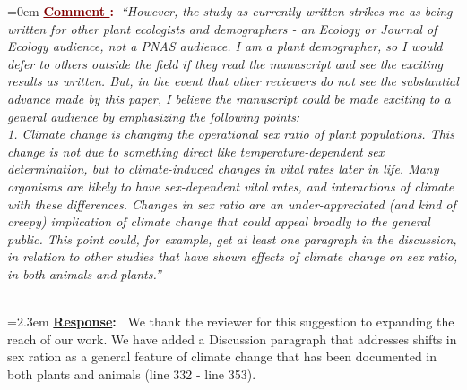 \documentclass[12pt]{article}
\newcounter{cN}
\newcommand{\comment}[1]{
	\vspace{2em}
	\refstepcounter{cN} %
	\noindent \hangindent=0em \textbf{\textcolor{Maroon}{\uline{Comment \thecN}:~}}\emph{``#1''}
	}
\newcommand{\response}[1]{
	\\[0.25em]
	\hangindent=2.3em \textbf{\textcolor{NavyBlue}{\uline{Response}:~}}#1
	}
\begin{document}
\comment{However, the study as currently written strikes me as being written for other plant ecologists and demographers - an Ecology or Journal of Ecology audience, not a PNAS audience. I am a plant demographer, so I would defer to others outside the field if they read the manuscript and see the exciting results as written. But, in the event that other reviewers do not see the substantial advance made by this paper, I believe the manuscript could be made exciting to a general audience by emphasizing the following points:
\\
1. Climate change is changing the operational sex ratio of plant populations. This change is not due to something direct like temperature-dependent sex determination, but to climate-induced changes in vital rates later in life. Many organisms are likely to have sex-dependent vital rates, and interactions of climate with these differences. Changes in sex ratio are an under-appreciated (and kind of creepy) implication of climate change that could appeal broadly to the general public. This point could, for example, get at least one paragraph in the discussion, in relation to other studies that have shown effects of climate change on sex ratio, in both animals and plants.}
\response{ We thank the reviewer for this suggestion to expanding the reach of our work. We have added a Discussion paragraph that addresses shifts in sex ration as a general feature of climate change that has been documented in both plants and animals (line 332 - line 353).}
\end{document}
